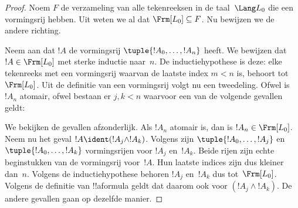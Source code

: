 \documentclass[openany]{memoir}
\begin{document}
\begin{proof}
  Noem $F$ de verzameling van alle tekenreeksen in de taal~$\Lang L_0$
  die een vormingsrij hebben. Uit
 weten we al dat
$\Frm[L_0] \subseteq F$. Nu bewijzen we de andere richting.

  Neem aan dat $!A$ de vormingsrij $\tuple{!A_0,\dotsc,!A_n}$ heeft. We
  bewijzen dat $!A \in \Frm[L_0]$ met sterke inductie naar~$n$. De
inductiehypothese is deze: elke tekenreeks met een vormingsrij waarvan
de laatste index $m < n$ is, behoort tot~$\Frm[L_0]$. Uit de definitie
van een vormingsrij volgt nu een tweedeling. Ofwel is $!A_n$ atomair,
ofwel bestaan er $j,k < n$ waarvoor een van de volgende gevallen
geldt:
\begin{enumerate}
\end{enumerate}
We bekijken de gevallen afzonderlijk. Als $!A_n$ atomair is, dan is
$!A_n \in \Frm[L_0]$. Neem nu het geval $!A \ident
(!A_j \land !A_k)$. Volgens  zijn
$\tuple{!A_0,\dotsc,!A_j}$ en $\tuple{!A_0,\dotsc,!A_k}$ vormingsrijen
voor $!A_j$ en~$!A_k$. Beide rijen zijn echte beginstukken van de
vormingsrij voor~$!A$. Hun laatste indices zijn dus kleiner dan~$n$.
Volgens de inductiehypothese behoren $!A_j$ en~$!A_k$ dus
  tot~$\Frm[L_0]$. Volgens de definitie van !!a{formula} geldt dat daarom
  ook voor $(!A_j \land !A_k)$. De andere gevallen gaan op
dezelfde manier.
\end{proof}
\endgroup

\begingroup
\def\olfilename{OLP-0061}
\def\olfilepath{content/propositional-logic/syntax-and-semantics/}
\hypertarget{unit-OLP-0061}{}



\end{document}
